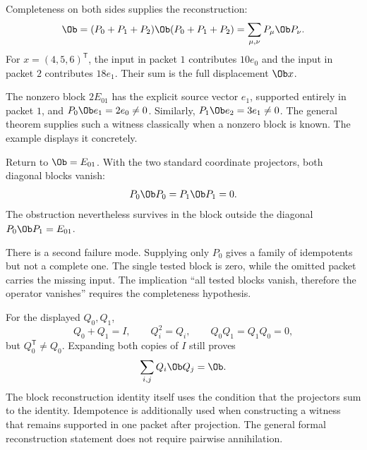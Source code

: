 
Completeness on both sides supplies the reconstruction:
\[
\Ob=(P_0+P_1+P_2)\Ob(P_0+P_1+P_2)
=\sum_{\mu,\nu}P_\mu\Ob P_\nu.
\]
For $x=(4,5,6)^\mathsf T$, the input in packet $1$ contributes $10e_0$ and the input in packet $2$ contributes $18e_1$. Their sum is the full displacement $\Ob x$.

The nonzero block $2E_{01}$ has the explicit source vector $e_1$, supported entirely in packet $1$, and $P_0\Ob e_1=2e_0\ne0$. Similarly, $P_1\Ob e_2=3e_1\ne0$. The general theorem supplies such a witness classically when a nonzero block is known. The example displays it concretely.


Return to $\Ob=E_{01}$. With the two standard coordinate projectors, both diagonal blocks vanish:
\[
P_0\Ob P_0=P_1\Ob P_1=0.
\]
The obstruction nevertheless survives in the block outside the diagonal $P_0\Ob P_1=E_{01}$.


There is a second failure mode. Supplying only $P_0$ gives a family of idempotents but not a complete one. The single tested block is zero, while the omitted packet carries the missing input. The implication ``all tested blocks vanish, therefore the operator vanishes'' requires the completeness hypothesis.

For the displayed $Q_0,Q_1$,
\[
Q_0+Q_1=I,\qquad Q_i^2=Q_i,\qquad Q_0Q_1=Q_1Q_0=0,
\]
but $Q_0^\mathsf T\ne Q_0$. Expanding both copies of $I$ still proves
\[
\sum_{i,j}Q_i\Ob Q_j=\Ob.
\]
The block reconstruction identity itself uses the condition that the projectors sum to the identity. Idempotence is additionally used when constructing a witness that remains supported in one packet after projection. The general formal reconstruction statement does not require pairwise annihilation.

